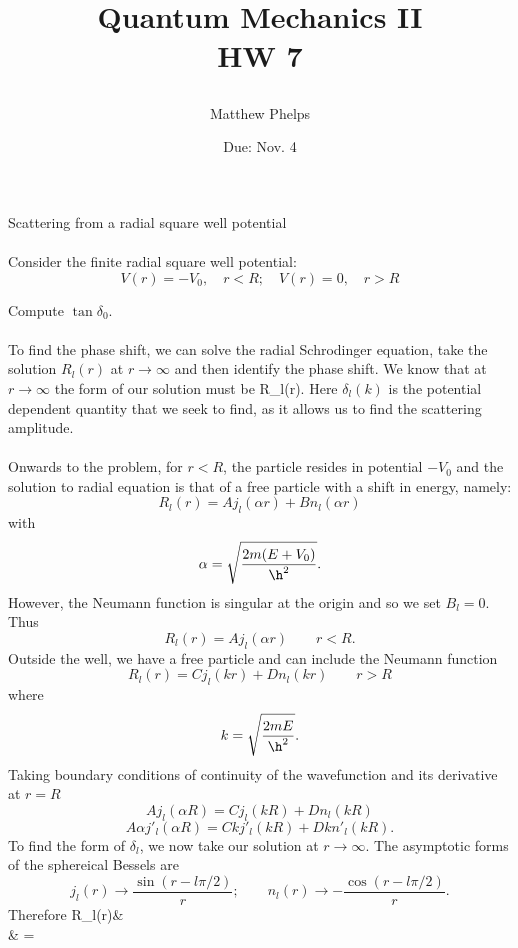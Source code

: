 \documentclass[10pt,letterpaper]{article}
\title{\begin{spacing}{1.2}Quantum Mechanics II\\HW 7\end{spacing}}
\author{Matthew Phelps}
\date{Due: Nov. 4}
\begin{document}
\maketitle

\benum
  	\item{Scattering from a radial square well potential}
	\\
	\\
	Consider the finite radial square well potential:
	\[
		V(r) = -V_0,\quad r<R;\quad V(r)=0,\quad r>R
	\]
	\benum
	\item
	Compute $\tan\delta_0$.
	\\
	\\
	To find the phase shift, we can solve the radial Schrodinger equation, take the solution $R_l(r)$ at $r\to \infty$ and 
	then identify the phase shift. We know that at $r\to\infty$ the form of our solution must be
	\be\label{1}
		R_l(r)\longrightarrow {}.
	\ee
	Here $\delta_l(k)$ is the potential dependent quantity that we seek to find, as it allows us to find the scattering
	amplitude. 
	\\
	\\
	Onwards to the problem, for $r<R$, the particle resides in potential $-V_0$
	and the solution to radial equation is that of a free particle with a shift in energy, namely:
	\[
		R_l(r) = Aj_l(\alpha r)+Bn_l(\alpha r)
	\]
	with
	\[
		\alpha = \sqrt\frac{2m(E+V_0)}{\h^2}.
	\]
	However, the Neumann function is singular at the origin and so we set $B_l =0$. Thus
	\[
		R_l(r) = Aj_l(\alpha r)\qquad r<R. 
	\]
	Outside the well, we have a free particle and can include the Neumann function 
	\[
		R_l(r) = Cj_l(kr)+Dn_l(kr)\qquad r>R
	\]
	where
	\[
		k = \sqrt\frac{2mE}{\h^2}. 
	\]
	Taking boundary conditions of continuity of the wavefunction and its derivative at $r=R$
	\[
		Aj_l(\alpha R) = Cj_l(kR)+Dn_l(kR)
	\]
	\[
		A\alpha j'_l(\alpha R) = Ckj'_l(kR)+Dkn'_l(kR).
	\]
	To find the form of $\delta_l$, we now take our solution at $r\to\infty$. The asymptotic forms of the sphereical
	Bessels are
	\[
		j_l(r) \to \frac{\sin(r-l\pi/2)}{r};\qquad n_l(r)\to -\frac{\cos(r-l\pi/2)}{r}.
	\]
	Therefore
	\ba
		R_l(r)&\longrightarrow {}\\
		& = 
\end{document}
